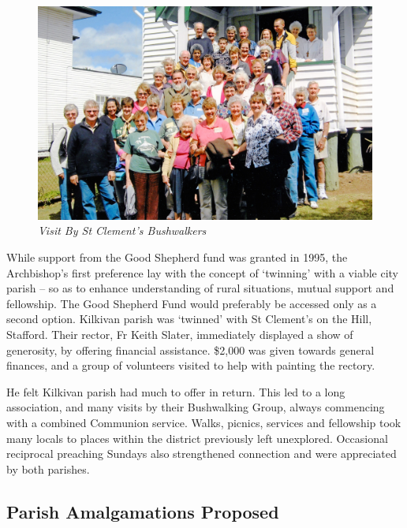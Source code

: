 \begin{figure}[!htb]
\begin{center}
\includegraphics[width=1.\textwidth,center]{../images/visitByStClementsBushwalkers.jpg}
\caption{\itshape Visit By St Clement's Bushwalkers}
\end{center}
\end{figure}




While support from the Good Shepherd fund was granted in 1995, the Archbishop's first preference lay with the concept of `twinning' with a viable city parish -- so as to enhance understanding of rural situations, mutual support and fellowship. The Good Shepherd Fund would preferably be accessed only as a second option. Kilkivan parish was `twinned' with St Clement's on the Hill, Stafford. Their rector, Fr Keith Slater, immediately displayed a show of generosity, by offering financial assistance. \$2,000 was given towards general finances, and a group of volunteers visited to help with painting the rectory.



He felt Kilkivan parish had much to offer in return. This led to a long association, and many visits by their Bushwalking Group, always commencing with a combined Communion service. Walks, picnics, services and fellowship took many locals to places within the district previously left unexplored. Occasional reciprocal preaching Sundays also strengthened connection and were appreciated by both parishes.



\subsection{Parish Amalgamations Proposed}



